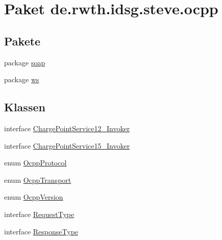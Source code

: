 \hypertarget{namespacede_1_1rwth_1_1idsg_1_1steve_1_1ocpp}{\section{Paket de.\+rwth.\+idsg.\+steve.\+ocpp}
\label{namespacede_1_1rwth_1_1idsg_1_1steve_1_1ocpp}
}
\subsection*{Pakete}
\begin{DoxyCompactItemize}
\item 
package \hyperlink{namespacede_1_1rwth_1_1idsg_1_1steve_1_1ocpp_1_1soap}{soap}
\item 
package \hyperlink{namespacede_1_1rwth_1_1idsg_1_1steve_1_1ocpp_1_1ws}{ws}
\end{DoxyCompactItemize}
\subsection*{Klassen}
\begin{DoxyCompactItemize}
\item 
interface \hyperlink{interfacede_1_1rwth_1_1idsg_1_1steve_1_1ocpp_1_1_charge_point_service12___invoker}{Charge\+Point\+Service12\+\_\+\+Invoker}
\item 
interface \hyperlink{interfacede_1_1rwth_1_1idsg_1_1steve_1_1ocpp_1_1_charge_point_service15___invoker}{Charge\+Point\+Service15\+\_\+\+Invoker}
\item 
enum \hyperlink{enumde_1_1rwth_1_1idsg_1_1steve_1_1ocpp_1_1_ocpp_protocol}{Ocpp\+Protocol}
\item 
enum \hyperlink{enumde_1_1rwth_1_1idsg_1_1steve_1_1ocpp_1_1_ocpp_transport}{Ocpp\+Transport}
\item 
enum \hyperlink{enumde_1_1rwth_1_1idsg_1_1steve_1_1ocpp_1_1_ocpp_version}{Ocpp\+Version}
\item 
interface \hyperlink{interfacede_1_1rwth_1_1idsg_1_1steve_1_1ocpp_1_1_request_type}{Request\+Type}
\item 
interface \hyperlink{interfacede_1_1rwth_1_1idsg_1_1steve_1_1ocpp_1_1_response_type}{Response\+Type}
\end{DoxyCompactItemize}
